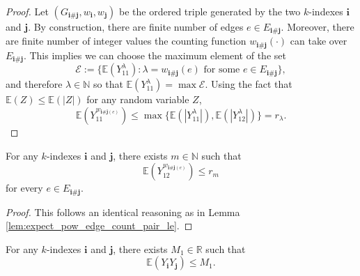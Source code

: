 \begin{proof}
  Let $(G_{\mathbf{i}\#\mathbf{j}},w_\mathbf{i},w_\mathbf{j})$ be the ordered triple generated by the two $k$-indexes $\mathbf{i}$ and $\mathbf{j}$. 
  By construction, there are finite number of edges $e \in E_{\mathbf{i} \# \mathbf{j}}$.
  Moreover, there are finite number of integer values the counting function $w_{\mathbf{i} \# \mathbf{j}}(\cdot)$ can take over $E_{\mathbf{i} \# \mathbf{j}}$.
  This implies we can choose the maximum element of the set
  \[
  \mathscr{E} := \{ \mathbb{E} (Y_{11}^\lambda) : \lambda = w_{\mathbf{i} \# \mathbf{j}}(e) \text{ for some } e \in E_{\mathbf{i} \# \mathbf{j}} \},
  \]
  and therefore $\lambda \in \mathbb{N}$ so that $\mathbb{E}(Y_{11}^\lambda) = \max \mathscr{E}$.
  Using the fact that $\mathbb{E}(Z) \leq \mathbb{E}(|Z|)$ for any random variable $Z$,
  \[
  \mathbb{E} (Y_{11}^{w_{\mathbf{i} \# \mathbf{j} (e)}}) \leq \max\{ \mathbb{E}(|Y_{11}^\lambda|), \mathbb{E}(|Y_{12}^\lambda|) \} = r_\lambda.
  \]
\end{proof}
\begin{lemma}
  \notready
  \label{lem:expect_pow_edge_count_pair_le'}
  For any $k$-indexes $\mathbf{i}$ and $\mathbf{j}$, there exists $m \in \mathbb{N}$ such that
  \[
  \mathbb{E} (Y_{12}^{w_{\mathbf{i} \# \mathbf{j} (e)}}) \leq r_m
  \]
  for every $e \in E_{\mathbf{i} \# \mathbf{j}}$.
\end{lemma}
\begin{proof}
  This follows an identical reasoning as in Lemma \ref{lem:expect_pow_edge_count_pair_le}.
\end{proof}
\begin{lemma}
  \notready
  \label{lem:expect_mul_le_const}
  For any $k$-indexes $\mathbf{i}$ and $\mathbf{j}$, there exists $M_1 \in \mathbb{R}$ such that
  \[
  \mathbb{E} (Y_\mathbf{i}Y_\mathbf{j}) \leq M_1.
  \]
\end{lemma}
